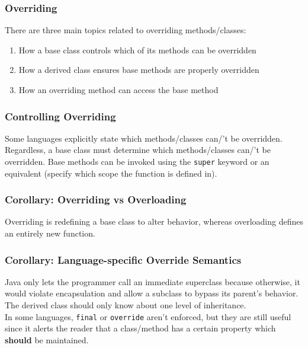 \documentclass{article}
\begin{document}
\subsubsection{Overriding}
There are three main topics related to overriding methods/classes:
\begin{enumerate}[label=(\roman*)]
\item How a base class controls which of its methods can be overridden
\item How a derived class ensures base methods are properly overridden
\item How an overriding method can access the base method
\end{enumerate}

\subsubsection*{Controlling Overriding}
Some languages explicitly state which methods/classes can/'t be
overridden. Regardless, a base class must determine which methods/classes
can/'t be overridden. Base methods can be invoked using the
\texttt{super} keyword or an equivalent (specify which scope the
function is defined in).

\subsubsection*{Corollary: Overriding vs Overloading}
Overriding is redefining a base class to alter behavior, whereas
overloading defines an entirely new function.

\subsubsection*{Corollary: Language-specific Override Semantics}
Java only lets the programmer call an immediate superclass because
otherwise, it would violate encapsulation and allow a subclass to
bypass its parent's behavior. The derived class should only know about
one level of inheritance. \\
In some languages, \texttt{final} or \texttt{override} aren't
enforced, but they are still useful since it alerts the reader that a
class/method has a certain property which \textbf{should} be maintained.
\end{document}
